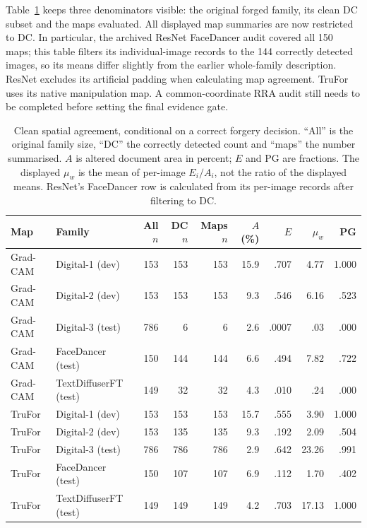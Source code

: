 Table~\ref{tab:clean-spatial} keeps three denominators visible: the original forged family, its clean DC subset and the maps evaluated. All displayed map summaries are now restricted to DC. In particular, the archived ResNet FaceDancer audit covered all 150 maps; this table filters its individual-image records to the 144 correctly detected images, so its means differ slightly from the earlier whole-family description. ResNet excludes its artificial padding when calculating map agreement. TruFor uses its native manipulation map. 
A common-coordinate RRA audit still needs to be completed before setting the final evidence gate.

\begin{table}[htbp]
\centering\small\setlength{\tabcolsep}{5pt}
\caption{Clean spatial agreement, conditional on a correct forgery decision. ``All'' is the original family size, ``DC'' the correctly detected count and ``maps'' the number summarised. $A$ is altered document area in percent; $E$ and PG are fractions. The displayed $\mu_w$ is the mean of per-image $E_i/A_i$, not the ratio of the displayed means. ResNet's FaceDancer row is calculated from its per-image records after filtering to DC.}
\label{tab:clean-spatial}
\begin{tabular}{@{}llr|rr|r|rrr@{}}
\toprule
Map & Family & All $n$ & DC $n$ & Maps $n$ & $A$ (\%) & $E$ & $\mu_w$ & PG \\
\midrule
Grad-CAM & Digital-1 (dev) & 153 & 153 & 153 & 15.9 & .707 & 4.77 & 1.000 \\
Grad-CAM & Digital-2 (dev) & 153 & 153 & 153 & 9.3 & .546 & 6.16 & .523 \\
\midrule
Grad-CAM & Digital-3 (test) & 786 & 6 & 6 & 2.6 & .0007 & .03 & .000 \\
Grad-CAM & FaceDancer (test) & 150 & 144 & 144 & 6.6 & .494 & 7.82 & .722 \\
Grad-CAM & TextDiffuserFT (test) & 149 & 32 & 32 & 4.3 & .010 & .24 & .000 \\
\midrule
\addlinespace

TruFor & Digital-1 (dev) & 153 & 153 & 153 & 15.7 & .555 & 3.90 & 1.000 \\
TruFor & Digital-2 (dev) & 153 & 135 & 135 & 9.3 & .192 & 2.09 & .504 \\
\midrule
TruFor & Digital-3 (test) & 786 & 786 & 786 & 2.9 & .642 & 23.26 & .991 \\
TruFor & FaceDancer (test) & 150 & 107 & 107 & 6.9 & .112 & 1.70 & .402 \\
TruFor & TextDiffuserFT (test) & 149 & 149 & 149 & 4.2 & .703 & 17.13 & 1.000 \\
\bottomrule
\end{tabular}
\end{table}

